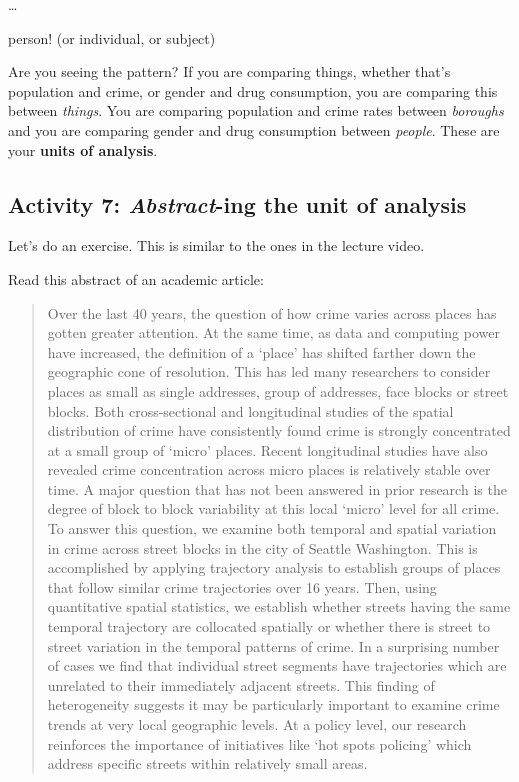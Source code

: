 \documentclass[
]{book}
\begin{document}
\ldots{}

person! (or individual, or subject)

Are you seeing the pattern? If you are comparing things, whether that's population and crime, or gender and drug consumption, you are comparing this between \emph{things}. You are comparing population and crime rates between \emph{boroughs} and you are comparing gender and drug consumption between \emph{people}. These are your \textbf{units of analysis}.

\hypertarget{activity-7-abstract-ing-the-unit-of-analysis}{%
\subsection{\texorpdfstring{Activity 7: \emph{Abstract}-ing the unit of analysis}{Activity 7: Abstract-ing the unit of analysis}}\label{activity-7-abstract-ing-the-unit-of-analysis}}

Let's do an exercise. This is similar to the ones in the lecture video.

Read this abstract of an academic article:

\begin{quote}
Over the last 40 years, the question of how crime varies across places has gotten greater attention. At the same time, as data and computing power have increased, the definition of a `place' has shifted farther down the geographic cone of resolution. This has led many researchers to consider places as small as single addresses, group of addresses, face blocks or street blocks. Both cross-sectional and longitudinal studies of the spatial distribution of crime have consistently found crime is strongly concentrated at a small group of `micro' places. Recent longitudinal studies have also revealed crime concentration across micro places is relatively stable over time. A major question that has not been answered in prior research is the degree of block to block variability at this local `micro' level for all crime. To answer this question, we examine both temporal and spatial variation in crime across street blocks in the city of Seattle Washington. This is accomplished by applying trajectory analysis to establish groups of places that follow similar crime trajectories over 16 years. Then, using quantitative spatial statistics, we establish whether streets having the same temporal trajectory are collocated spatially or whether there is street to street variation in the temporal patterns of crime. In a surprising number of cases we find that individual street segments have trajectories which are unrelated to their immediately adjacent streets. This finding of heterogeneity suggests it may be particularly important to examine crime trends at very local geographic levels. At a policy level, our research reinforces the importance of initiatives like `hot spots policing' which address specific streets within relatively small areas.
\end{quote}
\end{document}
